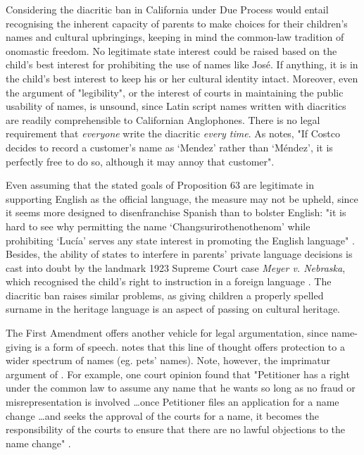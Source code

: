 Considering the diacritic ban in California under Due Process would entail
recognising the inherent capacity of parents to make choices for their
children's names and cultural upbringings, keeping in mind the common-law
tradition of onomastic freedom. No legitimate state interest could be raised
based on the child's best interest for prohibiting the use of names like José.
If anything, it is in the child's best interest to keep his or her cultural
identity intact. Moreover, even the argument of "legibility", or the interest
of courts in maintaining the public usability of names, is unsound, since Latin
script names written with diacritics are readily comprehensible to Californian
Anglophones. There is no legal requirement that \textit{everyone} write the
diacritic \textit{every time}. As \textcite[191]{larson11} notes, "If Costco
decides to record a customer's name as `Mendez' rather than `Méndez', it is
perfectly free to do so, although it may annoy that customer".

Even assuming that the stated goals of Proposition 63 are legitimate in
supporting English as the official language, the measure may not be upheld,
since it seems more designed to disenfranchise Spanish than to bolster English:
"it is hard to see why permitting the name `Changsurirothenothenom' while
prohibiting `Lucía' serves any state interest in promoting the English
language" \parencite[189]{larson11}. Besides, the ability of states to
interfere in parents' private language decisions is cast into doubt by the
landmark 1923 Supreme Court case \textit{Meyer v. Nebraska}, which recognised
the child's right to instruction in a foreign language \parencite{larson11}
\parencite{baron92}. The diacritic ban raises similar problems, as giving
children a properly spelled surname in the heritage language is an aspect of
passing on cultural heritage.

The First Amendment offers another vehicle for legal argumentation, since
name-giving is a form of speech. \textcite{larson11} notes that this line of
thought offers protection to a wider spectrum of names (eg. pets' names). Note,
however, the imprimatur argument of \textcite{heymann11}. For example, one
court opinion found that "Petitioner has a right under the common law to assume
any name that he wants so long as no fraud or misrepresentation is involved
\dots once Petitioner files an application for a name change \dots and seeks
the approval of the courts for a name, it becomes the responsibility of the
courts to ensure that there are no lawful objections to the name change"
\parencite{variable08} \parencite[413]{heymann11}.

